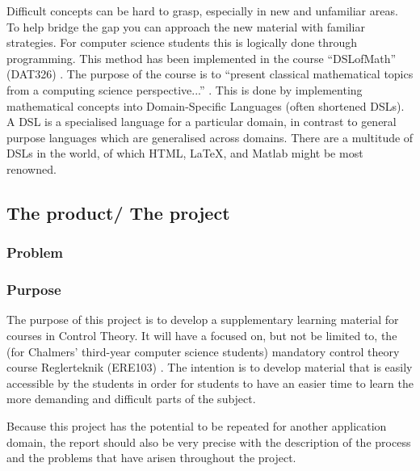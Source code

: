 Difficult concepts can be hard to grasp, especially in new and unfamiliar areas. To help bridge the gap you can approach the new material with familiar strategies. For computer science students this is logically done through programming. This method has been implemented in the course “DSLofMath” (DAT326) \cite{DAT326}. The purpose of the course is to ``present classical mathematical topics from a computing science perspective...'' \cite{DAT326}. This is done by implementing mathematical concepts into Domain-Specific Languages (often shortened DSLs). A DSL is a specialised language for a particular domain, in contrast to general purpose languages which are generalised across domains. There are a multitude of DSLs in the world, of which HTML, \LaTeX, and Matlab \cite{mernik_heering_sloane_2005} might be most renowned.


\subsection{The product/ The project}


\subsubsection{Problem}





\subsubsection{Purpose}\label{sec:purpose} 
The purpose of this project is to develop a supplementary learning material for courses in Control Theory. It will have a focused on, but not be limited to, the (for Chalmers' third-year computer science students) mandatory control theory course Reglerteknik (ERE103) \cite{ERE103}.  The intention is to develop material that is easily accessible by the students in order for students to have an easier time to learn the more demanding and difficult parts of the subject. 

Because this project has the potential to be repeated for another application domain, the report should also be very precise with the description of the process and the problems that have arisen throughout the project.
\fi

\iffalse
Syfte
Specificerar vad rapporten är tänkt att resultera i och vilken typ av resultat som kommer att uppnås. 
Lämpligt att ha ett generellt syfte, kanske några få specificerade delsyften. 
I problemanalysen bryts syftet ner i mer detaljerade delsyften.
\fi